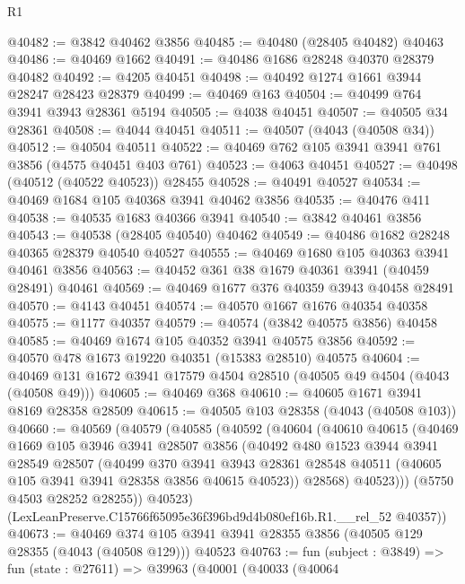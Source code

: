 \begin{lexlean}{R1}
\begin{coremodule}
@40482 := @3842 @40462 @3856
@40485 := @40480 (@28405 @40482) @40463
@40486 := @40469 @1662
@40491 := @40486 @1686 @28248 @40370 @28379 @40482
@40492 := @4205 @40451
@40498 := @40492 @1274 @1661 @3944 @28247 @28423 @28379
@40499 := @40469 @163
@40504 := @40499 @764 @3941 @3943 @28361 @5194
@40505 := @4038 @40451
@40507 := @40505 @34 @28361
@40508 := @4044 @40451
@40511 := @40507 (@4043 (@40508 @34))
@40512 := @40504 @40511
@40522 := @40469 @762 @105 @3941 @3941 @761 @3856 (@4575 @40451 @403 @761)
@40523 := @4063 @40451
@40527 := @40498 (@40512 (@40522 @40523)) @28455
@40528 := @40491 @40527
@40534 := @40469 @1684 @105 @40368 @3941 @40462 @3856
@40535 := @40476 @411
@40538 := @40535 @1683 @40366 @3941
@40540 := @3842 @40461 @3856
@40543 := @40538 (@28405 @40540) @40462
@40549 := @40486 @1682 @28248 @40365 @28379 @40540 @40527
@40555 := @40469 @1680 @105 @40363 @3941 @40461 @3856
@40563 := @40452 @361 @38 @1679 @40361 @3941 (@40459 @28491) @40461
@40569 := @40469 @1677 @376 @40359 @3943 @40458 @28491
@40570 := @4143 @40451
@40574 := @40570 @1667 @1676 @40354 @40358
@40575 := @1177 @40357
@40579 := @40574 (@3842 @40575 @3856) @40458
@40585 := @40469 @1674 @105 @40352 @3941 @40575 @3856
@40592 := @40570 @478 @1673 @19220 @40351 (@15383 @28510) @40575
@40604 := @40469 @131 @1672 @3941 @17579 @4504 @28510 (@40505 @49 @4504 (@4043 (@40508 @49)))
@40605 := @40469 @368
@40610 := @40605 @1671 @3941 @8169 @28358 @28509
@40615 := @40505 @103 @28358 (@4043 (@40508 @103))
@40660 := @40569
    (@40579
      (@40585
        (@40592
          (@40604
            (@40610
              @40615
              (@40469
                @1669
                @105
                @3946
                @3941
                @28507
                @3856
                (@40492
                  @480
                  @1523
                  @3944
                  @3941
                  @28549
                  @28507
                  (@40499
                    @370
                    @3941
                    @3943
                    @28361
                    @28548
                    @40511
                    (@40605 @105 @3941 @3941 @28358 @3856 @40615 @40523))
                  @28568)
                @40523)))
          (@5750 @4503 @28252 @28255))
        @40523)
      (LexLeanPreserve.C15766f65095e36f396bd9d4b080ef16b.R1.__rel_52 @40357))
@40673 := @40469
    @374
    @105
    @3941
    @3941
    @28355
    @3856
    (@40505 @129 @28355 (@4043 (@40508 @129)))
    @40523
@40763 := fun (subject : @3849) =>
  fun (state : @27611) =>
  @39963
    (@40001
      (@40033
        (@40064

\end{coremodule}
\end{lexlean}
